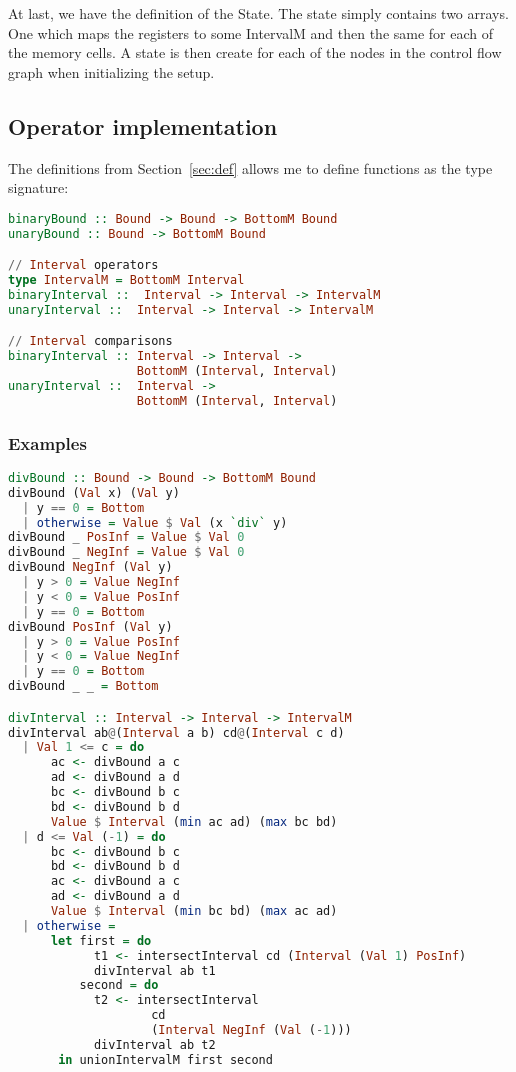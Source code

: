 At last, we have the definition of the State. The state simply contains two
arrays. One which maps the registers to some IntervalM and then the same for
each of the memory cells. A state is then create for each of the nodes in the
control flow graph when initializing the setup.

\subsection{Operator implementation}\label{sec:opImp}
The definitions from Section~\ref{sec:def} allows me to define functions as the type signature:
\begin{lstlisting}[language={haskell}]
binaryBound :: Bound -> Bound -> BottomM Bound
unaryBound :: Bound -> BottomM Bound

// Interval operators
type IntervalM = BottomM Interval
binaryInterval ::  Interval -> Interval -> IntervalM
unaryInterval ::  Interval -> Interval -> IntervalM

// Interval comparisons
binaryInterval :: Interval -> Interval -> 
                  BottomM (Interval, Interval)
unaryInterval ::  Interval -> 
                  BottomM (Interval, Interval)
\end{lstlisting}

\subsubsection*{Examples}
\begin{lstlisting}[language={haskell}, caption={Full division implementation}, label={lst:div}]
divBound :: Bound -> Bound -> BottomM Bound
divBound (Val x) (Val y)
  | y == 0 = Bottom
  | otherwise = Value $ Val (x `div` y)
divBound _ PosInf = Value $ Val 0
divBound _ NegInf = Value $ Val 0
divBound NegInf (Val y)
  | y > 0 = Value NegInf
  | y < 0 = Value PosInf
  | y == 0 = Bottom
divBound PosInf (Val y)
  | y > 0 = Value PosInf
  | y < 0 = Value NegInf
  | y == 0 = Bottom
divBound _ _ = Bottom

divInterval :: Interval -> Interval -> IntervalM
divInterval ab@(Interval a b) cd@(Interval c d)
  | Val 1 <= c = do
      ac <- divBound a c
      ad <- divBound a d
      bc <- divBound b c
      bd <- divBound b d
      Value $ Interval (min ac ad) (max bc bd)
  | d <= Val (-1) = do
      bc <- divBound b c
      bd <- divBound b d
      ac <- divBound a c
      ad <- divBound a d
      Value $ Interval (min bc bd) (max ac ad)
  | otherwise =
      let first = do
            t1 <- intersectInterval cd (Interval (Val 1) PosInf)
            divInterval ab t1
          second = do
            t2 <- intersectInterval 
                    cd
                    (Interval NegInf (Val (-1)))
            divInterval ab t2
       in unionIntervalM first second
\end{lstlisting}  
